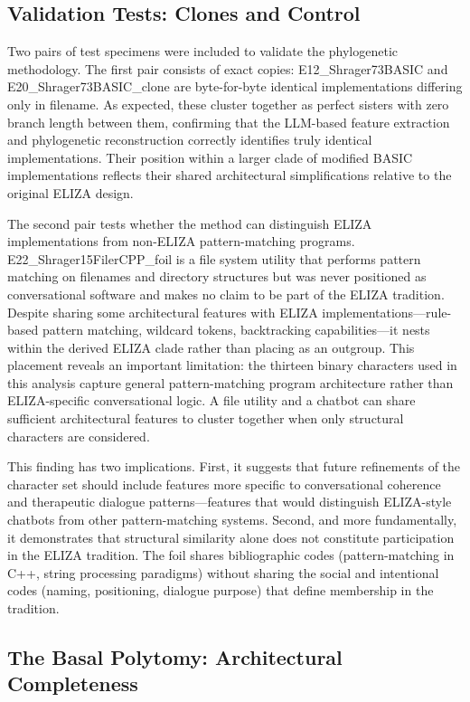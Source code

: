 \documentclass{article}
\begin{document}
\subsection{Validation Tests: Clones and Control}

Two pairs of test specimens were included to validate the phylogenetic methodology. The first pair consists of exact copies: E12\_Shrager73BASIC and E20\_Shrager73BASIC\_clone are byte-for-byte identical implementations differing only in filename. As expected, these cluster together as perfect sisters with zero branch length between them, confirming that the LLM-based feature extraction and phylogenetic reconstruction correctly identifies truly identical implementations. Their position within a larger clade of modified BASIC implementations reflects their shared architectural simplifications relative to the original ELIZA design.

The second pair tests whether the method can distinguish ELIZA implementations from non-ELIZA pattern-matching programs. E22\_Shrager15FilerCPP\_foil is a file system utility that performs pattern matching on filenames and directory structures but was never positioned as conversational software and makes no claim to be part of the ELIZA tradition. Despite sharing some architectural features with ELIZA implementations—rule-based pattern matching, wildcard tokens, backtracking capabilities—it nests within the derived ELIZA clade rather than placing as an outgroup. This placement reveals an important limitation: the thirteen binary characters used in this analysis capture general pattern-matching program architecture rather than ELIZA-specific conversational logic. A file utility and a chatbot can share sufficient architectural features to cluster together when only structural characters are considered.

This finding has two implications. First, it suggests that future refinements of the character set should include features more specific to conversational coherence and therapeutic dialogue patterns—features that would distinguish ELIZA-style chatbots from other pattern-matching systems. Second, and more fundamentally, it demonstrates that structural similarity alone does not constitute participation in the ELIZA tradition. The foil shares bibliographic codes (pattern-matching in C++, string processing paradigms) without sharing the social and intentional codes (naming, positioning, dialogue purpose) that define membership in the tradition.

\subsection{The Basal Polytomy: Architectural Completeness}
\end{document}
